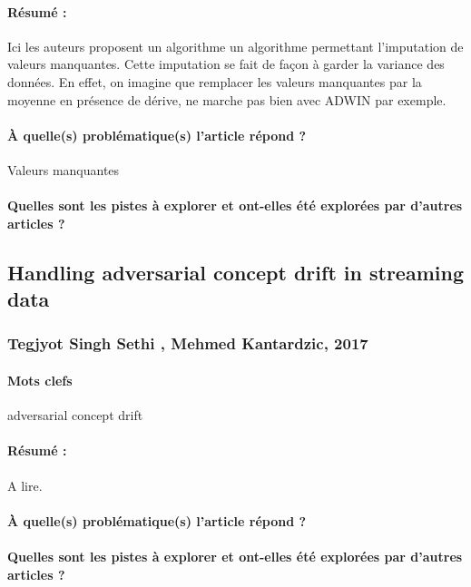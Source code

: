 \documentclass[11pt,a4paper]{report}
\begin{document}
\paragraph{Résumé :} Ici les auteurs proposent un algorithme un algorithme permettant l'imputation de valeurs manquantes. Cette imputation se fait de façon à garder la variance des données. En effet, on imagine que remplacer les valeurs manquantes par la moyenne en présence de dérive, ne marche pas bien avec ADWIN par exemple.

\paragraph{À quelle(s) problématique(s) l'article répond ?} Valeurs manquantes

\paragraph{Quelles sont les pistes à explorer et ont-elles  été explorées par d'autres articles ?}









\subsection{Handling adversarial concept drift in streaming data}
\subsubsection{Tegjyot Singh Sethi , Mehmed Kantardzic, 2017}

\paragraph{Mots clefs}  adversarial concept drift 

\paragraph{Résumé :} A lire.

\paragraph{À quelle(s) problématique(s) l'article répond ?}

\paragraph{Quelles sont les pistes à explorer et ont-elles  été explorées par d'autres articles ?}
\end{document}

